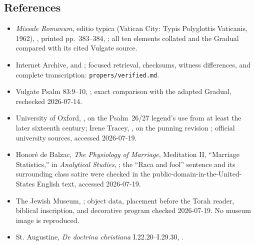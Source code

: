 \begin{deepstudy}
\section*{References}
{\footnotesize
\begin{itemize}[itemsep=0em,topsep=0.15em,parsep=0pt]
\item \emph{Missale Romanum}, editio typica (Vatican City: Typis Polyglottis Vaticanis, 1962), , printed pp.~383--384, ; all ten elements collated and the Gradual compared with its cited Vulgate source.
\item Internet Archive,  and ; focused retrieval, checksums, witness differences, and complete transcription: \nolinkurl{propers/verified.md}.
\item Vulgate Psalm 83:9--10, ; exact comparison with the adapted Gradual, rechecked 2026-07-14.
\item University of Oxford, , on the Psalm~26/27 legend's use from at least the later sixteenth century; Irene Tracey, , on the punning revision ; official university sources, accessed 2026-07-19.
\item Honoré de Balzac, \emph{The Physiology of Marriage}, Meditation II, ``Marriage Statistics,'' in \emph{Analytical Studies}, ; the ``Raca and fool'' sentence and its surrounding class satire were checked in the public-domain-in-the-United-States English text, accessed 2026-07-19.
\item The Jewish Museum, ; object data, placement before the Torah reader, biblical inscription, and decorative program checked 2026-07-19. No museum image is reproduced.
\item St. Augustine, \emph{De doctrina christiana} I.22.20--I.29.30, .

\end{itemize}}
\end{deepstudy}
